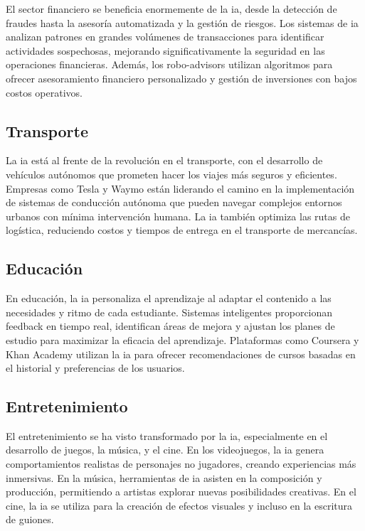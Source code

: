 El sector financiero se beneficia enormemente de la \acrshort{ia}, desde la detección de fraudes hasta la asesoría automatizada y la gestión de riesgos. Los sistemas de \acrshort{ia} analizan patrones en grandes volúmenes de transacciones para identificar actividades sospechosas, mejorando significativamente la seguridad en las operaciones financieras. Además, los robo-advisors utilizan algoritmos para ofrecer asesoramiento financiero personalizado y gestión de inversiones con bajos costos operativos.

\subsection{Transporte}

La \acrshort{ia} está al frente de la revolución en el transporte, con el desarrollo de vehículos autónomos que prometen hacer los viajes más seguros y eficientes. Empresas como Tesla y Waymo están liderando el camino en la implementación de sistemas de conducción autónoma que pueden navegar complejos entornos urbanos con mínima intervención humana. La \acrshort{ia} también optimiza las rutas de logística, reduciendo costos y tiempos de entrega en el transporte de mercancías.

\subsection{Educación}

En educación, la \acrshort{ia} personaliza el aprendizaje al adaptar el contenido a las necesidades y ritmo de cada estudiante. Sistemas inteligentes proporcionan feedback en tiempo real, identifican áreas de mejora y ajustan los planes de estudio para maximizar la eficacia del aprendizaje. Plataformas como Coursera y Khan Academy utilizan la \acrshort{ia} para ofrecer recomendaciones de cursos basadas en el historial y preferencias de los usuarios.

\subsection{Entretenimiento}

El entretenimiento se ha visto transformado por la \acrshort{ia}, especialmente en el desarrollo de juegos, la música, y el cine. En los videojuegos, la \acrshort{ia} genera comportamientos realistas de personajes no jugadores, creando experiencias más inmersivas. En la música, herramientas de \acrshort{ia} asisten en la composición y producción, permitiendo a artistas explorar nuevas posibilidades creativas. En el cine, la \acrshort{ia} se utiliza para la creación de efectos visuales y incluso en la escritura de guiones.